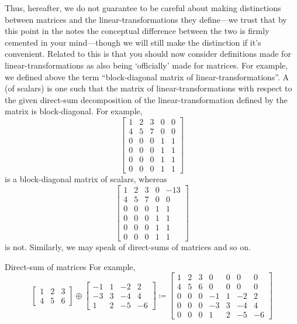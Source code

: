 Thus, hereafter, we do not guarantee to be careful about making distinctions between matrices and the linear-transformations they define---we trust that by this point in the notes the conceptual difference between the two is firmly cemented in your mind---though we will still make the distinction if it's convenient.  Related to this is that you should now consider definitions made for linear-transformations as also being `officially' made for matrices.  For example, we defined above the term ``block-diagonal matrix of linear-transformations''.  A  (of scalars) is one such that the matrix of linear-transformations with respect to the given direct-sum decomposition of the linear-transformation defined by the matrix is block-diagonal.  For example,
\begin{equation}
	\begin{bmatrix}1 & 2 & 3 & 0 & 0 \\ 4 & 5 & 7 & 0 & 0 \\ 0 & 0 & 0 & 1 & 1 \\ 0 & 0 & 0 & 1 & 1 \\ 0 & 0 & 0 & 1 & 1 \\ 0 & 0 & 0 & 1 & 1\end{bmatrix}
\end{equation}
is a block-diagonal matrix of scalars, whereas
\begin{equation}
	\begin{bmatrix}1 & 2 & 3 & 0 & -13 \\ 4 & 5 & 7 & 0 & 0 \\ 0 & 0 & 0 & 1 & 1 \\ 0 & 0 & 0 & 1 & 1 \\ 0 & 0 & 0 & 1 & 1 \\ 0 & 0 & 0 & 1 & 1\end{bmatrix}
\end{equation}
is not.  Similarly, we may speak of direct-sums of matrices and so on.
\begin{exm}{Direct-sum of matrices}{}
	For example,
	\begin{equation}
		\begin{bmatrix}1 & 2 & 3 \\ 4 & 5 & 6\end{bmatrix}\oplus \begin{bmatrix}-1 & 1 & -2 & 2 \\ -3 & 3 & -4 & 4 \\ 1 & 2 & -5 & -6\end{bmatrix}\coloneqq \begin{bmatrix}1 & 2 & 3 & 0 & 0 & 0 & 0 \\ 4 & 5 & 6 & 0 & 0 & 0 & 0 \\ 0 & 0 & 0 & -1 & 1 & -2 & 2 \\ 0 & 0 & 0 & -3 & 3 & -4 & 4 \\ 0 & 0 & 0 & 1 & 2 & -5 & -6\end{bmatrix}
	\end{equation}
\end{exm}

